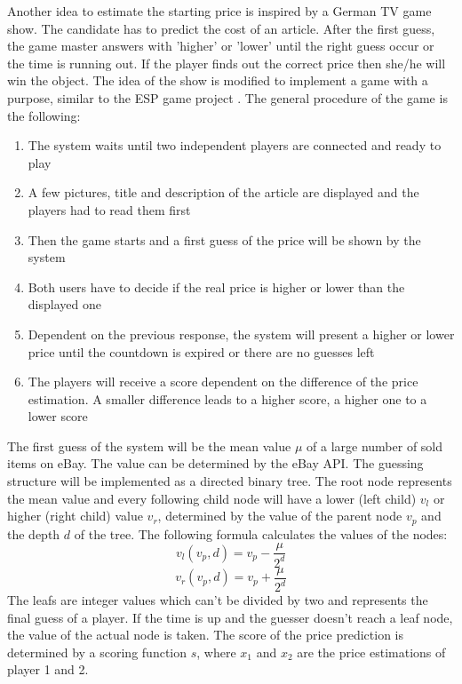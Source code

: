Another idea to estimate the starting price is inspired by a German TV game show. The candidate has to predict the cost of an article. After the first guess, the game master answers with 'higher' or 'lower' until the right guess occur or the time is running out. If the player finds out the correct price then she/he will win the object.  
The idea of the show is modified to implement a game with a purpose, similar to the ESP game project \cite{esp}. The general procedure of the game is the following: 
\begin{enumerate}
	\item The system waits until two independent players are connected and ready to play 
	\item A few pictures, title and description of the article are displayed and the players had to read them first 
	\item Then the game starts and a first guess of the price will be shown by the system 
	\item Both users have to decide if the real price is higher or lower than the displayed one 
	\item Dependent on the previous response, the system will present a higher or lower price until the countdown is expired or there are no guesses left 
	\item The players will receive a score dependent on the difference of the price estimation. A smaller difference leads to a higher score, a higher one to a lower score 
\end{enumerate}
The first guess of the system will be the mean value \( \mu \) of a large number of sold items on eBay. The value can be determined by the eBay API. The guessing structure will be implemented as a directed binary tree. The root node represents the mean value and every following child node will have a lower (left child) \( v_l \) or higher (right child) value  \( v_r \), determined by the value of the parent node  \( v_p \) and the depth  \( d \) of the tree. The following formula calculates the values  of the nodes: 
\begin{equation}
v_l(v_p,d) = v_p - \frac{\mu}{2^d}
\end{equation}
\begin{equation}
v_r(v_p,d) = v_p + \frac{\mu}{2^d}
\end{equation}
The leafs are integer values which can't be divided by two and represents the final guess of a player. If the time is up and the guesser doesn't reach a leaf node, the value of the actual node is taken. 
The score of the price prediction is determined by a scoring function \( s \), where \( x_1 \) and \( x_2 \) are the price estimations of player 1 and 2.
